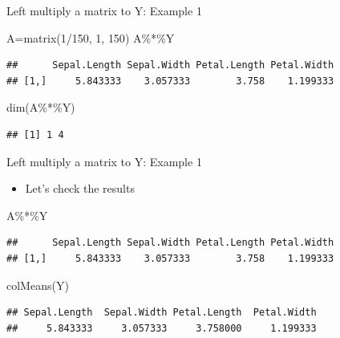\documentclass[
  ignorenonframetext,
]{beamer}
\newenvironment{Shaded}{\begin{snugshade}}{\end{snugshade}}
\newcommand{\DecValTok}[1]{\textcolor[rgb]{0.00,0.00,0.81}{#1}}
\newcommand{\FunctionTok}[1]{\textcolor[rgb]{0.00,0.00,0.00}{#1}}
\newcommand{\NormalTok}[1]{#1}
\newcommand{\OtherTok}[1]{\textcolor[rgb]{0.56,0.35,0.01}{#1}}
\newcommand{\SpecialCharTok}[1]{\textcolor[rgb]{0.00,0.00,0.00}{#1}}
\providecommand{\tightlist}{%
  \setlength{\itemsep}{0pt}\setlength{\parskip}{0pt}}
\begin{document}
\begin{frame}[fragile]{Left multiply a matrix to Y: Example 1}
\protect\hypertarget{left-multiply-a-matrix-to-y-example-1-1}{}
\begin{Shaded}
\begin{Highlighting}[]
\NormalTok{A}\OtherTok{=}\FunctionTok{matrix}\NormalTok{(}\DecValTok{1}\SpecialCharTok{/}\DecValTok{150}\NormalTok{, }\DecValTok{1}\NormalTok{, }\DecValTok{150}\NormalTok{)}
\NormalTok{A}\SpecialCharTok{\%*\%}\NormalTok{Y}
\end{Highlighting}
\end{Shaded}

\begin{verbatim}
##      Sepal.Length Sepal.Width Petal.Length Petal.Width
## [1,]     5.843333    3.057333        3.758    1.199333
\end{verbatim}

\begin{Shaded}
\begin{Highlighting}[]
\FunctionTok{dim}\NormalTok{(A}\SpecialCharTok{\%*\%}\NormalTok{Y)}
\end{Highlighting}
\end{Shaded}

\begin{verbatim}
## [1] 1 4
\end{verbatim}
\end{frame}

\begin{frame}[fragile]{Left multiply a matrix to Y: Example 1}
\protect\hypertarget{left-multiply-a-matrix-to-y-example-1-2}{}
\begin{itemize}
\tightlist
\item
  Let's check the results
\end{itemize}

\begin{Shaded}
\begin{Highlighting}[]
\NormalTok{A}\SpecialCharTok{\%*\%}\NormalTok{Y}
\end{Highlighting}
\end{Shaded}

\begin{verbatim}
##      Sepal.Length Sepal.Width Petal.Length Petal.Width
## [1,]     5.843333    3.057333        3.758    1.199333
\end{verbatim}

\begin{Shaded}
\begin{Highlighting}[]
\FunctionTok{colMeans}\NormalTok{(Y)}
\end{Highlighting}
\end{Shaded}

\begin{verbatim}
## Sepal.Length  Sepal.Width Petal.Length  Petal.Width 
##     5.843333     3.057333     3.758000     1.199333
\end{verbatim}
\end{frame}
\end{document}
